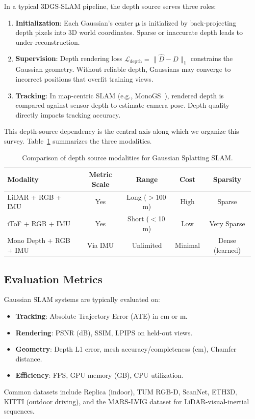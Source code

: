 In a typical 3DGS-SLAM pipeline, the depth source serves three roles:
\begin{enumerate}
    \item \textbf{Initialization}: Each Gaussian's center $\boldsymbol{\mu}$
    is initialized by back-projecting depth pixels into 3D world coordinates.
    Sparse or inaccurate depth leads to under-reconstruction.
    \item \textbf{Supervision}: Depth rendering loss
    $\mathcal{L}_{\text{depth}} = \|\hat{D} - D\|_1$ constrains the Gaussian
    geometry.  Without reliable depth, Gaussians may converge to incorrect
    positions that overfit training views.
    \item \textbf{Tracking}: In map-centric SLAM (e.g.,
    MonoGS~\cite{matsuki2024monogs}), rendered depth is compared against
    sensor depth to estimate camera pose.  Depth quality directly impacts
    tracking accuracy.
\end{enumerate}

This depth-source dependency is the central axis along which we organize
this survey.  Table~\ref{tab:depth_sources} summarizes the three modalities.

\begin{table}[t]
\centering
\caption{Comparison of depth source modalities for Gaussian Splatting SLAM.}
\label{tab:depth_sources}
\small
\begin{tabular}{lcccc}
\toprule
\textbf{Modality} & \textbf{Metric Scale} & \textbf{Range} & \textbf{Cost} & \textbf{Sparsity} \\
\midrule
LiDAR + RGB + IMU & Yes & Long ($>$100\,m) & High & Sparse \\
iToF + RGB + IMU & Yes & Short ($<$10\,m) & Low & Very Sparse \\
Mono Depth + RGB + IMU & Via IMU & Unlimited & Minimal & Dense (learned) \\
\bottomrule
\end{tabular}
\end{table}

\subsection{Evaluation Metrics}

Gaussian SLAM systems are typically evaluated on:
\begin{itemize}
    \item \textbf{Tracking}: Absolute Trajectory Error (ATE) in cm or m.
    \item \textbf{Rendering}: PSNR (dB), SSIM, LPIPS on held-out views.
    \item \textbf{Geometry}: Depth L1 error, mesh accuracy/completeness
    (cm), Chamfer distance.
    \item \textbf{Efficiency}: FPS, GPU memory (GB), CPU utilization.
\end{itemize}
Common datasets include Replica (indoor), TUM RGB-D, ScanNet, ETH3D, KITTI
(outdoor driving), and the MARS-LVIG dataset for LiDAR-visual-inertial
sequences.
